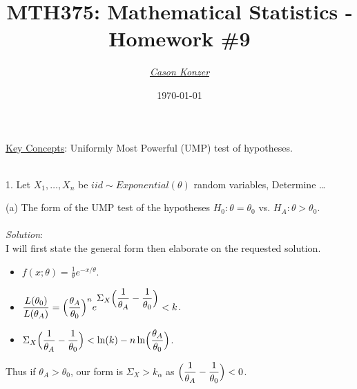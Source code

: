 \documentclass[12pt]{article}
\newcommand{\XB}{\color{black}}
\newcommand{\XBB}{\color{blue}}
\newcommand{\XV}{\color{violet}}
\newcommand{\ds}{\displaystyle}
\begin{document}
\title{\textbf{MTH375}: Mathematical Statistics - Homework \#9}
\date{\today}
\author{\XV\textit{\large{\href{https://github.com/casonk}{Cason Konzer}}}\XB}

\maketitle
\hrulefill
\vfill 
    \underline{Key Concepts}: Uniformly Most Powerful (UMP) test of hypotheses.

\newpage
\newpage
\XBB\hrulefill\XB \\

1. Let $ X_{1}, \dots , X_{n} $ be $ iid \sim Exponential(\theta) $ random variables, Determine \dots \\ 

\XBB\hrulefill\XB 
\vspace{5mm}

(a) The form of the UMP test of the hypotheses $ H_{0} : \theta = \theta_{0} $ vs. $ H_{A} : \theta > \theta_{0} $. \\
\vspace{2.5mm} \\
\textit{Solution}:
\vspace{2.5mm} \\

\noindent
I will first state the general form then elaborate on the requested solution. \\

\begin{itemize}
    \item $ \ds f(x; \theta) = \frac{1}{\theta} e^{-x/\theta} $.
    \item $ \ds \frac{L(\theta_{0})}{L(\theta_{A})} = \Bigl( \frac{\theta_{A}}{\theta_{0}} \Bigr)^{n} e^{\ds \Sigma_{X} \Bigl( \frac{1}{\theta_{A}} - \frac{1}{\theta_{0}} \Bigr)} < k $.
    \item $ \ds \Sigma_{X} \Bigl( \frac{1}{\theta_{A}} - \frac{1}{\theta_{0}} \Bigr) < \ln(k) - n\ln\Bigl( \frac{\theta_{A}}{\theta_{0}} \Bigr) $.
\end{itemize}

\noindent
Thus if $ \theta_{A} > \theta_{0} $, our form is $ \Sigma_{X} > k_{\alpha} $ as $ \ds \Bigl( \frac{1}{\theta_{A}} - \frac{1}{\theta_{0}} \Bigr) < 0 $. \\
\end{document}
